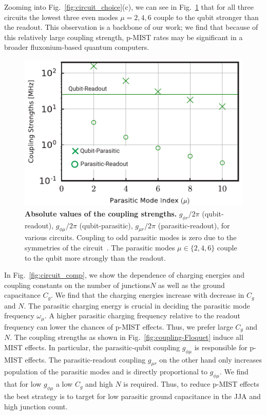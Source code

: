\documentclass[%
reprint,
superscriptaddress,
 amsmath,amssymb,
 aps,
 prx,
longbibliography,
floatfix,
]{revtex4-2}
\begin{document}
Zooming into Fig.~\ref{fig:circuit_choice}(c), we can see in Fig.~\ref{fig:coupling-strength} that for all three circuits the lowest three even modes $\mu=2,4,6$ couple to the qubit stronger than the readout. This observation is a backbone of our work; we find that because of this relatively large coupling strength, p-MIST rates may be significant in a broader fluxonium-based quantum computers.
\begin{figure}[htb]
    \centering
    \includegraphics[width=\linewidth]{Supp_Fig/Coupling-strength.pdf}
    \caption{{\bf Absolute values of the coupling strengths.} $g_{\phi r}/2\pi$ (qubit-readout), $g_{\phi\mu}/2\pi$ (qubit-parasitic), $g_{\mu r}/2\pi$ (parasitic-readout), for various circuits. Coupling to odd parasitic modes is zero due to the symmetries of the circuit~\cite{viola2015collective}. The parasitic modes $\mu\in\{2,4,6\}$ couple to the qubit more strongly than the readout.}
    \label{fig:coupling-strength}
\end{figure}

In Fig.~\ref{fig:circuit_comp}, we show the dependence of charging energies and coupling constants on the number of junctions$N$ as well as the ground capacitance $C_g$. We find that the charging energies increase with decrease in $C_g$ and $N$. The parasitic charging energy is crucial in deciding the parasitic mode frequency $\omega_{\mu}$. A higher parasitic charging frequency relative to the readout frequency can lower the chances of p-MIST effects. Thus, we prefer large $C_g$ and $N$. The coupling strengths as shown in Fig.~\ref{fig:coupling-Floquet} induce all MIST effects. In particular, the parasitic-qubit coupling $g_{\phi\mu}$ is responsible for p-MIST effects. The parasitic-readout coupling $g_{\mu r}$ on the other hand only increases population  of the parasitic modes and is directly proportional to $g_{\phi\mu}$. We find that for low $g_{\phi\mu}$ a low $C_g$ and high $N$ is required. Thus, to reduce p-MIST effects the best strategy is to target for low parasitic ground capacitance in the JJA and high junction count.
\end{document}
